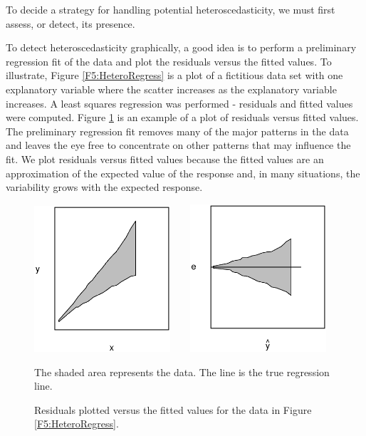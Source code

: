 To decide a strategy for handling potential heteroscedasticity, we
must first assess, or detect, its presence.

To detect heteroscedasticity graphically, a good idea is to perform
a preliminary regression fit of the data and plot the residuals
versus the fitted values. To illustrate, Figure
\ref{F5:HeteroRegress} is a plot of a fictitious data set with one
explanatory variable where the scatter increases as the explanatory
variable increases. A least squares regression was performed -
residuals and fitted values were computed. Figure
\ref{F5:HeteroResid} is an example of a plot of residuals versus
fitted values. The preliminary regression fit removes many of the
major patterns in the data and leaves the eye free to concentrate on
other patterns that may influence the fit. We plot residuals versus
fitted values because the fitted values are an approximation of the
expected value of the response and, in many situations, the
variability grows with the expected response.


\begin{figure}[htp]
    \includegraphics[width=0.45\textwidth]{Chapter5/F5HeteroRegress.eps}
    $~~~~~~$
    \includegraphics[width=0.45\textwidth]{Chapter5/F5HeteroResid.eps}    \hfill
      \parbox[t]{2.5in}{\caption{\label{F5:HeteroRegress} \small  The shaded area
represents the data. The line is the true regression line.}} \hfill
        \parbox[t]{2.5in}{ \caption{\label{F5:HeteroResid} \small  Residuals plotted
versus the fitted values for the data in Figure
\ref{F5:HeteroRegress}.}}
\end{figure}

